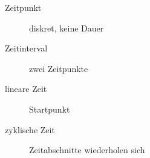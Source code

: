 \begin{description}
	\item[Zeitpunkt] diskret, keine Dauer
	\item[Zeitinterval] zwei Zeitpunkte
	\item[lineare Zeit] Startpunkt
	\item[zyklische Zeit] Zeitabschnitte wiederholen sich
\end{description}